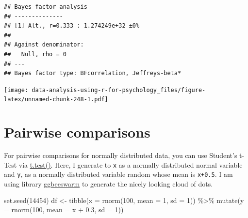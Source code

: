 \documentclass[
]{book}
\newenvironment{Shaded}{\begin{snugshade}}{\end{snugshade}}
\newcommand{\AttributeTok}[1]{\textcolor[rgb]{0.77,0.63,0.00}{#1}}
\newcommand{\ConstantTok}[1]{\textcolor[rgb]{0.00,0.00,0.00}{#1}}
\newcommand{\DecValTok}[1]{\textcolor[rgb]{0.00,0.00,0.81}{#1}}
\newcommand{\FloatTok}[1]{\textcolor[rgb]{0.00,0.00,0.81}{#1}}
\newcommand{\FunctionTok}[1]{\textcolor[rgb]{0.00,0.00,0.00}{#1}}
\newcommand{\NormalTok}[1]{#1}
\newcommand{\OtherTok}[1]{\textcolor[rgb]{0.56,0.35,0.01}{#1}}
\newcommand{\SpecialCharTok}[1]{\textcolor[rgb]{0.00,0.00,0.00}{#1}}
\newcommand{\StringTok}[1]{\textcolor[rgb]{0.31,0.60,0.02}{#1}}
\begin{document}
\begin{verbatim}
## Bayes factor analysis
## --------------
## [1] Alt., r=0.333 : 1.274249e+32 ±0%
## 
## Against denominator:
##   Null, rho = 0 
## ---
## Bayes factor type: BFcorrelation, Jeffreys-beta*
\end{verbatim}

\begin{Shaded}
\end{Shaded}

\texttt{[image: data-analysis-using-r-for-psychology\_files/figure-latex/unnamed-chunk-248-1.pdf]}

\hypertarget{pairwise-comparisons}{%
\section{Pairwise comparisons}\label{pairwise-comparisons}}

For pairwise comparisons for normally distributed data, you can use Student's t-Test via \href{https://stat.ethz.ch/R-manual/R-devel/library/stats/html/t.test.html}{t.test()}. Here, I generate to \texttt{x} as a normally distributed normal variable and \texttt{y}, as a normally distributed variable random whose mean is \texttt{x+0.5}. I am using library \href{https://github.com/eclarke/ggbeeswarm}{ggbeeswarm} to generate the nicely looking cloud of dots.

\begin{Shaded}
\begin{Highlighting}[]
\FunctionTok{set.seed}\NormalTok{(}\DecValTok{14454}\NormalTok{)}
\NormalTok{df }\OtherTok{\textless{}{-}} 
  \FunctionTok{tibble}\NormalTok{(}\AttributeTok{x =} \FunctionTok{rnorm}\NormalTok{(}\DecValTok{100}\NormalTok{, }\AttributeTok{mean =} \DecValTok{1}\NormalTok{, }\AttributeTok{sd =} \DecValTok{1}\NormalTok{)) }\SpecialCharTok{\%\textgreater{}\%}
  \FunctionTok{mutate}\NormalTok{(}\AttributeTok{y =} \FunctionTok{rnorm}\NormalTok{(}\DecValTok{100}\NormalTok{, }\AttributeTok{mean =}\NormalTok{ x }\SpecialCharTok{+} \FloatTok{0.3}\NormalTok{, }\AttributeTok{sd =} \DecValTok{1}\NormalTok{))}
\end{Highlighting}
\end{Shaded}
\end{document}
